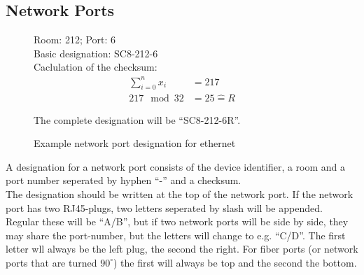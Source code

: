 %
%
%
%
%
%
%

\subsection{Network Ports}
\label{chap:spec_netport}

\begin{wrapfigure}{r}{0.35\textwidth}
	Room: 212; Port: 6 \\
	Basic designation: SC8-212-6 \\

	Caclulation of the checksum:
	\begin{align*}
		\sum_{i=0}^{n} x_i &= 217 \\
		217 \mod 32 &= 25 \hat{=} R
	\end{align*}

	The complete designation will be ``SC8-212-6R''.

	\caption{Example network port designation for ethernet}
\end{wrapfigure}

A designation for a network port consists of the device identifier, a room and a
port number seperated by hyphen ``-'' and a checksum. \\

The designation should be written at the top of the network port. If the
network port has two RJ45-plugs, two letters seperated by slash will be
appended. Regular these will be ``A/B'', but if two network ports will be side
by side, they may share the port-number, but the letters will change to e.g.
``C/D''. The first letter wll always be the left plug, the second the right. For
fiber ports (or network ports that are turned $90^{\circ}$) the first will
always be top and the second the bottom. \\

